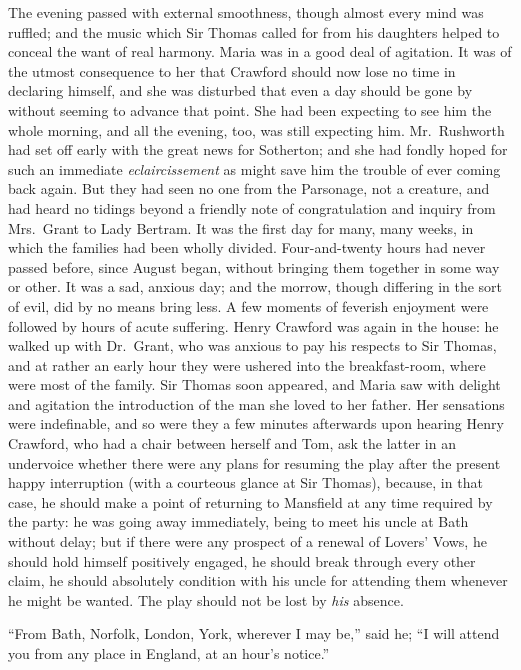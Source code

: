 The evening passed with external smoothness, though almost
every mind was ruffled; and the music which Sir Thomas
called for from his daughters helped to conceal the want
of real harmony.  Maria was in a good deal of agitation.
It was of the utmost consequence to her that Crawford
should now lose no time in declaring himself, and she
was disturbed that even a day should be gone by without
seeming to advance that point.  She had been expecting
to see him the whole morning, and all the evening, too,
was still expecting him.  Mr.\ Rushworth had set off early
with the great news for Sotherton; and she had fondly hoped
for such an immediate \emph{eclaircissement} as might save him
the trouble of ever coming back again.  But they had seen
no one from the Parsonage, not a creature, and had heard
no tidings beyond a friendly note of congratulation
and inquiry from Mrs.\ Grant to Lady Bertram.  It was
the first day for many, many weeks, in which the families
had been wholly divided.  Four-and-twenty hours had never
passed before, since August began, without bringing them
together in some way or other.  It was a sad, anxious day;
and the morrow, though differing in the sort of evil,
did by no means bring less.  A few moments of feverish
enjoyment were followed by hours of acute suffering.
Henry Crawford was again in the house:  he walked up
with Dr.\ Grant, who was anxious to pay his respects to
Sir Thomas, and at rather an early hour they were ushered
into the breakfast-room, where were most of the family.
Sir Thomas soon appeared, and Maria saw with delight
and agitation the introduction of the man she loved to
her father.  Her sensations were indefinable, and so were
they a few minutes afterwards upon hearing Henry Crawford,
who had a chair between herself and Tom, ask the latter
in an undervoice whether there were any plans for resuming
the play after the present happy interruption (with
a courteous glance at Sir Thomas), because, in that case,
he should make a point of returning to Mansfield at any time
required by the party:  he was going away immediately,
being to meet his uncle at Bath without delay; but if there
were any prospect of a renewal of Lovers' Vows, he should
hold himself positively engaged, he should break through
every other claim, he should absolutely condition with his
uncle for attending them whenever he might be wanted.
The play should not be lost by \emph{his} absence.

``From Bath, Norfolk, London, York, wherever I may be,''
said he; ``I will attend you from any place in England,
at an hour's notice.''

